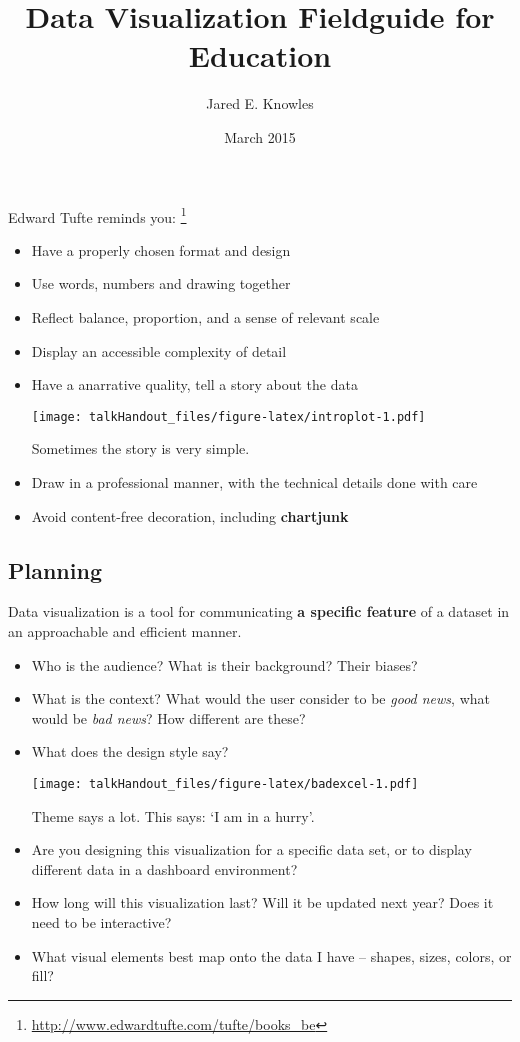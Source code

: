 \documentclass{tufte-handout}
\title{Data Visualization Fieldguide for Education}
\author{Jared E. Knowles}
\date{March 2015}
\begin{document}
\maketitle



Edward Tufte reminds you: \footnote{\url{http://www.edwardtufte.com/tufte/books_be}}

\begin{itemize}
\itemsep1pt\parskip0pt
\item
  Have a properly chosen format and design
\item
  Use words, numbers and drawing together
\item
  Reflect balance, proportion, and a sense of relevant scale
\item
  Display an accessible complexity of detail
\item
  Have a anarrative quality, tell a story about the data

  \begin{marginfigure}
   \texttt{[image: talkHandout\_files/figure-latex/introplot-1.pdf]}
  \caption{Sometimes the story is very simple.}
  \end{marginfigure}
\item
  Draw in a professional manner, with the technical details done with
  care
\item
  Avoid content-free decoration, including \textbf{chartjunk}
\end{itemize}

\subsection{Planning}\label{planning}

Data visualization is a tool for communicating \textbf{a specific
feature} of a dataset in an approachable and efficient
manner.

\begin{itemize}
\itemsep1pt\parskip0pt
\item
  Who is the audience? What is their background? Their biases?
\item
  What is the context? What would the user consider to be \emph{good
  news}, what would be \emph{bad news}? How different are these?
\item
  What does the design style say?

  \begin{marginfigure}
   \texttt{[image: talkHandout\_files/figure-latex/badexcel-1.pdf]}
  \caption{Theme says a lot. This says: `I am in a hurry'.}
  \end{marginfigure}
\item
  Are you designing this visualization for a specific data set, or to
  display different data in a dashboard environment?
\item
  How long will this visualization last? Will it be updated next year?
  Does it need to be interactive?
\item
  What visual elements best map onto the data I have -- shapes, sizes,
  colors, or fill?
\end{itemize}
\end{document}
